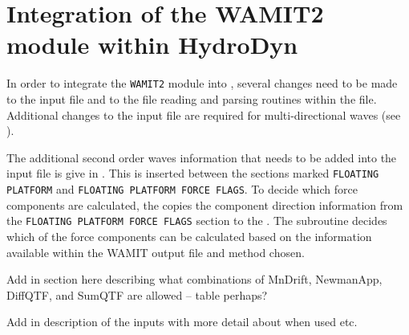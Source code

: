 \chapter{Integration of the WAMIT2 module within HydroDyn}
\label{chap:WAMIT2:Integration}

In order to integrate the {\tt WAMIT2} module into \HD, several changes need to be made to the \HD input file and to the file reading and parsing routines within the  file.  Additional changes to the input file are required for multi-directional waves (see ).

\begin{center}
   \begin{minipage}[t]{\linewidth}
   \end{minipage}
   \label{tab:HD_WAMIT2_InputMods}
\end{center}

The additional second order waves information that needs to be added into the \HD input file is give in .  This is inserted between the sections marked {\tt FLOATING PLATFORM} and {\tt FLOATING PLATFORM FORCE FLAGS}.  To decide which force components are calculated, the  copies the component direction information from the {\tt FLOATING PLATFORM FORCE FLAGS} section to the .  The  subroutine decides which of the force components can be calculated based on the information available within the WAMIT output file and method chosen.

Add in section here describing what combinations of MnDrift, NewmanApp, DiffQTF, and SumQTF are allowed -- table perhaps?

Add in description of the inputs with more detail about when used etc.


